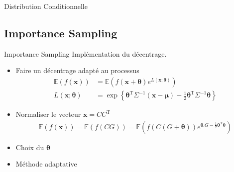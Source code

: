 \documentclass{beamer} %
\begin{document}
\begin{frame}[t]{Distribution Conditionnelle}
{\begin{figure}[htbp]
\begin{minipage}[b]{0.9\textwidth}
					\label{fig:MChist2}
				\end{minipage}
			\label{fig:label}
		\end{figure}}
	\end{frame}
	
	\subsection{Importance Sampling} %
	\label{sub:importance_sampling}
	
	\begin{frame}[t]{Importance Sampling}
		Implémentation du décentrage.
		\begin{itemize}
			\item<+-> Faire un décentrage adapté au processus
			\begin{align*}
				\mathbb{E}(f(\boldsymbol x)) &= \mathbb{E}(f(\boldsymbol x + \boldsymbol \theta) e^{L(\boldsymbol x;\boldsymbol \theta)}) \\
				L(\boldsymbol x;\boldsymbol \theta)& = \exp\left \{
				\boldsymbol\theta^\mathrm{T}{\Sigma}^{-1}({\mathbf x}-{\boldsymbol\mu})
				-\frac{1}{2}\boldsymbol\theta^\mathrm{T}{\Sigma}^{-1}\boldsymbol\theta
				\right \}
			\end{align*}
			\item<+-> Normaliser le vecteur $\boldsymbol x = CC^{\mathrm T}$
			\begin{align*}
				\mathbb{E}(f(\boldsymbol x)) = \mathbb{E}(f(CG)) = 
				\mathbb{E}(
				f(C(G+{\boldsymbol \theta}))
				e^{{\boldsymbol \theta}.G
				 -\frac{1}{2} \boldsymbol\theta^\mathrm{T} \boldsymbol\theta})
			\end{align*}
			\item<+-> Choix du $\boldsymbol \theta$
			\item<+-> Méthode adaptative
		\end{itemize}
	\end{frame}
\end{document}
